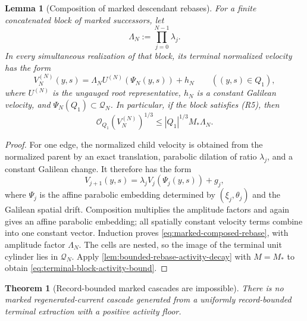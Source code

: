 \documentclass[11pt]{amsart}
\numberwithin{equation}{section}
\theoremstyle{plain}
\newtheorem{theorem}{Theorem}[section]
\newtheorem{lemma}[lemma]{Lemma}
\theoremstyle{definition}
\theoremstyle{remark}
\begin{document}
\begin{lemma}[Composition of marked descendant rebases]
\label{lem:marked-rebase-composition}
For a finite concatenated block of marked successors, let
\begin{equation}\label{eq:marked-composed-scale}
 \Lambda_N:=\prod_{j=0}^{N-1}\lambda_j .
\end{equation}
In every simultaneous realization of that block, its terminal normalized
velocity has the form
\begin{equation}\label{eq:marked-composed-rebase}
 V_N^{(N)}(y,s)
 =\Lambda_N U^{(N)}(\Psi_N(y,s))+h_N
 \qquad ((y,s)\in Q_1),
\end{equation}
where \(U^{(N)}\) is the ungauged root representative, \(h_N\) is a constant
Galilean velocity, and \(\Psi_N(Q_1)\subset\mathcal Q_N\).  In particular,
if the block satisfies \textup{(R5)}, then
\begin{equation}\label{eq:terminal-block-activity-bound}
 \mathcal O_{Q_1}(V_N^{(N)})^{1/3}
 \le |Q_1|^{1/3}M_*\Lambda_N .
\end{equation}
\end{lemma}

\begin{proof}
For one edge, the normalized child velocity is obtained from the normalized
parent by an exact translation, parabolic dilation of ratio \(\lambda_j\),
and a constant Galilean change.  It therefore has the form
\[
 V_{j+1}(y,s)
 =\lambda_jV_j(\Psi_j(y,s))+g_j,
\]
where \(\Psi_j\) is the affine parabolic embedding determined by
\((\xi_j,\theta_j)\) and the Galilean spatial drift.  Composition multiplies
the amplitude factors and again gives an affine parabolic embedding; all
spatially constant velocity terms combine into one constant vector.  Induction
proves \eqref{eq:marked-composed-rebase}, with amplitude factor
\(\Lambda_N\).  The cells are nested, so the image of the terminal unit
cylinder lies in \(\mathcal Q_N\).  Apply
\cref{lem:bounded-rebase-activity-decay} with \(M=M_*\) to obtain
\eqref{eq:terminal-block-activity-bound}.
\end{proof}

\begin{theorem}[Record-bounded marked cascades are impossible]
\label{thm:no-bounded-marked-regenerated-cascade}
There is no marked regenerated-current cascade generated from a uniformly
record-bounded terminal extraction with a positive activity floor.
\end{theorem}
\end{document}
